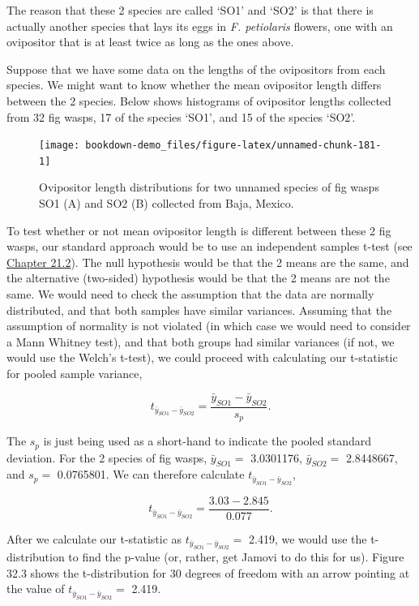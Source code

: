 \documentclass[
]{scrbook}
\begin{document}
The reason that these 2 species are called `SO1' and `SO2' is that there is actually another species that lays its eggs in \emph{F. petiolaris} flowers, one with an ovipositor that is at least twice as long as the ones above.

Suppose that we have some data on the lengths of the ovipositors from each species.
We might want to know whether the mean ovipositor length differs between the 2 species. Below shows histograms of ovipositor lengths collected from 32 fig wasps, 17 of the species `SO1', and 15 of the species `SO2'.

\begin{figure}
\texttt{[image: bookdown-demo\_files/figure-latex/unnamed-chunk-181-1]} \caption{Ovipositor length distributions for two unnamed species of fig wasps SO1 (A) and SO2 (B) collected from Baja, Mexico.}\label{fig:unnamed-chunk-181}
\end{figure}

To test whether or not mean ovipositor length is different between these 2 fig wasps, our standard approach would be to use an independent samples t-test (see \protect\hyperlink{independent-samples-t-test}{Chapter 21.2}).
The null hypothesis would be that the 2 means are the same, and the alternative (two-sided) hypothesis would be that the 2 means are not the same.
We would need to check the assumption that the data are normally distributed, and that both samples have similar variances.
Assuming that the assumption of normality is not violated (in which case we would need to consider a Mann Whitney test), and that both groups had similar variances (if not, we would use the Welch's t-test), we could proceed with calculating our t-statistic for pooled sample variance,

\[t_{\bar{y}_{SO1} - \bar{y}_{SO2}} = \frac{\bar{y}_{SO1} - \bar{y}_{SO2}}{s_{p}}.\]

The \(s_{p}\) is just being used as a short-hand to indicate the pooled standard deviation.
For the 2 species of fig wasps, \(\bar{y}_{SO1} =\) 3.0301176, \(\bar{y}_{SO2} =\) 2.8448667, and \(s_{p} =\) 0.0765801.
We can therefore calculate \(t_{\bar{y}_{SO1} - \bar{y}_{SO2}}\),

\[t_{\bar{y}_{SO1} - \bar{y}_{SO2}} = \frac{3.03 - 2.845}{0.077}.\]

After we calculate our t-statistic as \(t_{\bar{y}_{SO1} - \bar{y}_{SO2}} =\) 2.419, we would use the t-distribution to find the p-value (or, rather, get Jamovi to do this for us).
Figure 32.3 shows the t-distribution for 30 degrees of freedom with an arrow pointing at the value of \(t_{\bar{y}_{SO1} - \bar{y}_{SO2}} =\) 2.419.
\end{document}
